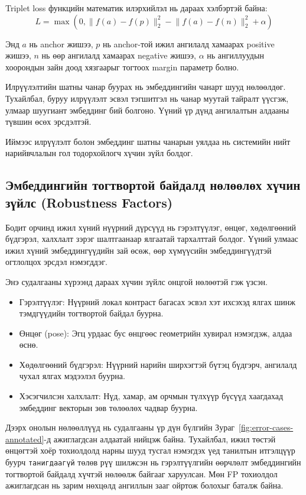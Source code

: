 Triplet loss функцийн математик илэрхийлэл нь дараах хэлбэртэй байна:
\[
L = \max \left(0, \lVert f(a)-f(p)\rVert_2^2 - \lVert f(a)-f(n)\rVert_2^2 + \alpha \right)
\]

Энд $a$ нь anchor жишээ, $p$ нь anchor-той ижил ангилалд хамаарах positive жишээ, $n$ нь өөр ангилалд хамаарах negative жишээ, $\alpha$ нь ангиллуудын хоорондын зайн доод хязгаарыг тогтоох margin параметр болно.

Илрүүлэлтийн шатны чанар буурах нь эмбеддингийн чанарт шууд нөлөөлдөг. Тухайлбал, буруу илрүүлэлт эсвэл тэгшитгэл нь чанар муутай тайралт үүсгэж, улмаар шуугиант эмбеддинг бий болгоно. Үүний үр дүнд ангилалтын алдааны түвшин өсөх эрсдэлтэй.

Иймээс илрүүлэлт болон эмбеддинг шатны чанарын уялдаа нь системийн нийт нарийвчлалын гол тодорхойлогч хүчин зүйл болдог.

\subsection{Эмбеддингийн тогтвортой байдалд нөлөөлөх хүчин зүйлс (Robustness Factors)}
Бодит орчинд ижил хүний нүүрний дүрсүүд нь гэрэлтүүлэг, өнцөг, хөдөлгөөний бүдгэрэл, халхлалт зэрэг шалтгаанаар ялгаатай тархалттай болдог. Үүний улмаас ижил хүний эмбеддингүүдийн зай өсөж, өөр хүмүүсийн эмбеддингүүдтэй огтлолцох эрсдэл нэмэгддэг.

Энэ судалгааны хүрээнд дараах хүчин зүйлс онцгой нөлөөтэй гэж үзсэн.
\begin{itemize}
\item Гэрэлтүүлэг: Нүүрний локал контраст багасах эсвэл хэт ихсэхэд ялгах шинж тэмдгүүдийн тогтвортой байдал буурна.
\item Өнцөг (pose): Эгц урдаас бус өнцгөөс геометрийн хувирал нэмэгдэж, алдаа өснө.
\item Хөдөлгөөний бүдгэрэл: Нүүрний нарийн ширхэгтэй бүтэц бүдгэрч, ангилалд чухал ялгах мэдээлэл буурна.
\item Хэсэгчилсэн халхлалт: Нүд, хамар, ам орчмын түлхүүр бүсүүд хаагдахад эмбеддинг векторын зөв төлөөлөх чадвар буурна.
\end{itemize}

Дээрх онолын нөлөөллүүд нь судалгааны үр дүн бүлгийн Зураг~\ref{fig:error-cases-annotated}-д ажиглагдсан алдаатай нийцэж байна. Тухайлбал, ижил төстэй өнцөгтэй хоёр тохиолдолд нарны шууд тусгал нэмэгдэх үед танилтын итгэлцүүр буурч \texttt{танигдаагүй} төлөв рүү шилжсэн нь гэрэлтүүлгийн өөрчлөлт эмбеддингийн тогтвортой байдалд хүчтэй нөлөөлж байгааг харуулсан. Мөн FP тохиолдол ажиглагдсан нь зарим нөхцөлд ангиллын зааг ойртож болохыг баталж байна.

